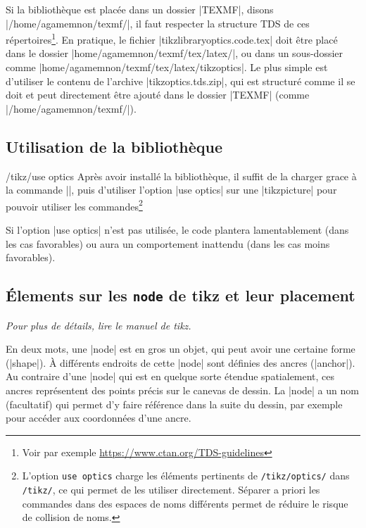 \documentclass[a4paper]{ltxdoc}
\begin{document}
Si la bibliothèque est placée dans un dossier |TEXMF|, disons |/home/agamemnon/texmf/|, il faut respecter la structure TDS de ces répertoires\footnote{Voir par exemple \url{https://www.ctan.org/TDS-guidelines}}. En pratique, le fichier |tikzlibraryoptics.code.tex| doit être placé dans le dossier |home/agamemnon/texmf/tex/latex/|, ou dans un sous-dossier comme |home/agamemnon/texmf/tex/latex/tikzoptics|. Le plus simple est d'utiliser le contenu de l'archive |tikzoptics.tds.zip|, qui est structuré comme il se doit et peut directement être ajouté dans le dossier |TEXMF| (comme |/home/agamemnon/texmf/|).


\subsection{Utilisation de la bibliothèque}

\begin{key}{/tikz/use optics}
Après avoir installé la bibliothèque, il suffit de la charger grace à la commande |\usetikzlibrary{optics}|, puis d'utiliser l'option |use optics| sur une |tikzpicture| pour pouvoir utiliser les commandes\footnote{L'option \texttt{use optics} charge les éléments pertinents de \texttt{/tikz/optics/} dans \texttt{/tikz/}, ce qui permet de les utiliser directement. Séparer a priori les commandes dans des espaces de noms différents permet de réduire le risque de collision de noms.}

\begin{codeexample}[width=5cm]
\end{codeexample}

Si l'option |use optics| n'est pas utilisée, le code plantera lamentablement (dans les cas favorables) ou aura un comportement inattendu (dans les cas moins favorables).
\end{key}

\subsection{Élements sur les \texttt{node} de tikz et leur placement}

\emph{Pour plus de détails, lire le manuel de tikz.}

En deux mots, une |node| est en gros un objet, qui peut avoir une certaine forme (|shape|). À différents endroits de cette |node| sont définies des ancres (|anchor|). Au contraire d'une |node| qui est en quelque sorte étendue spatialement, ces ancres représentent des points précis sur le canevas de dessin. La |node| a un nom (facultatif) qui permet d'y faire référence dans la suite du dessin, par exemple pour accéder aux coordonnées d'une ancre. 
\end{document}
